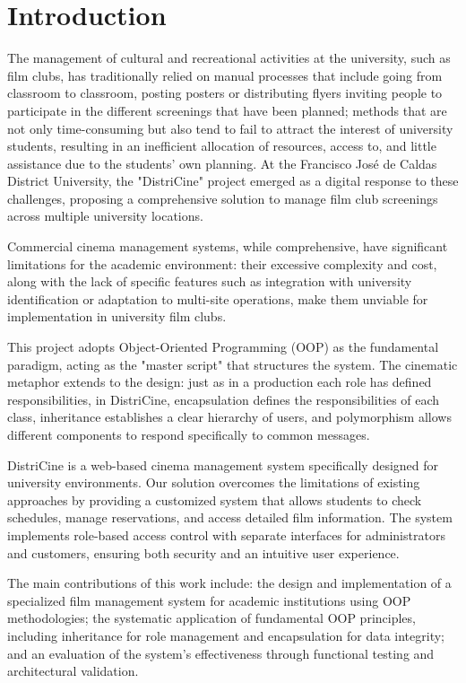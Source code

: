 \documentclass[12pt]{article}
\begin{document}
\section{Introduction}
The management of cultural and recreational activities at the university, such as film clubs, has traditionally relied on manual processes that include going from classroom to classroom, posting posters or distributing flyers inviting people to participate in the different screenings that have been planned; methods that are not only time-consuming but also tend to fail to attract the interest of university students, resulting in an inefficient allocation of resources, access to, and little assistance due to the students' own planning. At the Francisco José de Caldas District University, the "DistriCine" project emerged as a digital response to these challenges, proposing a comprehensive solution to manage film club screenings across multiple university locations.

Commercial cinema management systems, while comprehensive, have significant limitations for the academic environment: their excessive complexity and cost, along with the lack of specific features such as integration with university identification or adaptation to multi-site operations, make them unviable for implementation in university film clubs.

This project adopts Object-Oriented Programming (OOP) as the fundamental paradigm, acting as the "master script" that structures the system. The cinematic metaphor extends to the design: just as in a production each role has defined responsibilities, in DistriCine, encapsulation defines the responsibilities of each class, inheritance establishes a clear hierarchy of users, and polymorphism allows different components to respond specifically to common messages.

DistriCine is a web-based cinema management system specifically designed for university environments. Our solution overcomes the limitations of existing approaches by providing a customized system that allows students to check schedules, manage reservations, and access detailed film information. The system implements role-based access control with separate interfaces for administrators and customers, ensuring both security and an intuitive user experience.

The main contributions of this work include: the design and implementation of a specialized film management system for academic institutions using OOP methodologies; the systematic application of fundamental OOP principles, including inheritance for role management and encapsulation for data integrity; and an evaluation of the system's effectiveness through functional testing and architectural validation.
\end{document}
